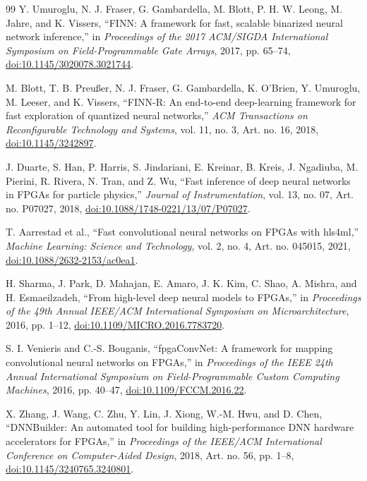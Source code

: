 \documentclass{article}
\newcommand{\doilink}[1]{\href{https://doi.org/#1}{doi:#1}}
\begin{document}
\begin{thebibliography}{99}
\small
\setlength{\itemsep}{2pt}
\setlength{\parskip}{0pt}
Y. Umuroglu, N. J. Fraser, G. Gambardella, M. Blott, P. H. W. Leong,
M. Jahre, and K. Vissers,
``FINN: A framework for fast, scalable binarized neural network inference,''
in \emph{Proceedings of the 2017 ACM/SIGDA International Symposium on Field-Programmable Gate Arrays},
2017, pp. 65--74, \doilink{10.1145/3020078.3021744}.

M. Blott, T. B. Preu{\ss}er, N. J. Fraser, G. Gambardella, K. O'Brien,
Y. Umuroglu, M. Leeser, and K. Vissers,
``FINN-R: An end-to-end deep-learning framework for fast exploration of quantized neural networks,''
\emph{ACM Transactions on Reconfigurable Technology and Systems},
vol. 11, no. 3, Art. no. 16, 2018, \doilink{10.1145/3242897}.

J. Duarte, S. Han, P. Harris, S. Jindariani, E. Kreinar, B. Kreis,
J. Ngadiuba, M. Pierini, R. Rivera, N. Tran, and Z. Wu,
``Fast inference of deep neural networks in FPGAs for particle physics,''
\emph{Journal of Instrumentation}, vol. 13, no. 07, Art. no. P07027, 2018,
\doilink{10.1088/1748-0221/13/07/P07027}.

T. Aarrestad et al.,
``Fast convolutional neural networks on FPGAs with hls4ml,''
\emph{Machine Learning: Science and Technology}, vol. 2, no. 4, Art. no. 045015, 2021,
\doilink{10.1088/2632-2153/ac0ea1}.

H. Sharma, J. Park, D. Mahajan, E. Amaro, J. K. Kim, C. Shao,
A. Mishra, and H. Esmaeilzadeh,
``From high-level deep neural models to FPGAs,''
in \emph{Proceedings of the 49th Annual IEEE/ACM International Symposium on Microarchitecture},
2016, pp. 1--12, \doilink{10.1109/MICRO.2016.7783720}.

S. I. Venieris and C.-S. Bouganis,
``fpgaConvNet: A framework for mapping convolutional neural networks on FPGAs,''
in \emph{Proceedings of the IEEE 24th Annual International Symposium on Field-Programmable Custom Computing Machines},
2016, pp. 40--47, \doilink{10.1109/FCCM.2016.22}.

X. Zhang, J. Wang, C. Zhu, Y. Lin, J. Xiong, W.-M. Hwu, and D. Chen,
``DNNBuilder: An automated tool for building high-performance DNN hardware accelerators for FPGAs,''
in \emph{Proceedings of the IEEE/ACM International Conference on Computer-Aided Design},
2018, Art. no. 56, pp. 1--8, \doilink{10.1145/3240765.3240801}.


\end{thebibliography}
\end{document}
